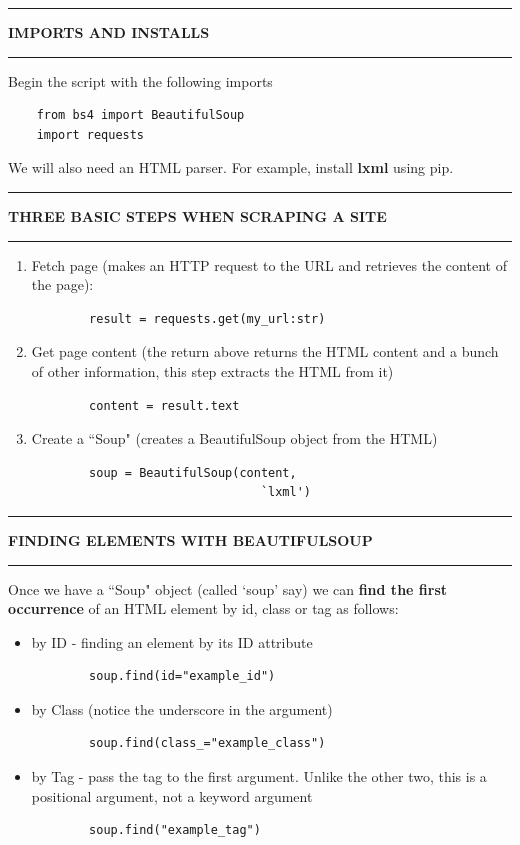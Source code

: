 \documentclass[8pt]{extarticle}
\newcommand{\heading}[1]{%
    \noindent
    \rule{\linewidth}{0.4pt}
    \begin{center}
        \vspace{-1ex}
        \textbf{#1}        
        \vspace{-2.5ex}
    \end{center}
    \rule{\linewidth}{0.4pt}
}
\begin{document}
\begin{multicols}{3}
\heading{IMPORTS AND INSTALLS}

Begin the script with the following imports

\begin{lstlisting}
    from bs4 import BeautifulSoup
    import requests
\end{lstlisting}

We will also need an HTML parser. For example, install \textbf{lxml} using pip.

\heading{THREE BASIC STEPS WHEN SCRAPING A SITE}

\begin{enumerate}
    \item Fetch page (makes an HTTP request to the URL and retrieves the content of the page):
    \begin{lstlisting}
        result = requests.get(my_url:str)
    \end{lstlisting}
    \item Get page content (the return above returns the HTML content and a bunch of other information, this step extracts the HTML from it)
    \begin{lstlisting}
        content = result.text
    \end{lstlisting}
    \item Create a ``Soup" (creates a BeautifulSoup object from the HTML)
    \begin{lstlisting}
        soup = BeautifulSoup(content,
                                `lxml')
    \end{lstlisting}
\end{enumerate}

\columnbreak
\heading{FINDING ELEMENTS WITH BEAUTIFULSOUP}

Once we have a ``Soup" object (called `soup' say) we can \textbf{find the first occurrence} of an HTML element by id, class or tag as follows:

\begin{itemize}
    \item by ID - finding an element by its ID attribute
    \begin{lstlisting}
        soup.find(id="example_id")
    \end{lstlisting}
    \item by Class (notice the underscore in the argument)
    \begin{lstlisting}
        soup.find(class_="example_class")
    \end{lstlisting}
    \item by Tag - pass the tag to the first argument. Unlike the other two, this is a positional argument, not a keyword argument
    \begin{lstlisting}
        soup.find("example_tag")
    \end{lstlisting}
\end{itemize}


\end{multicols}
\end{document}
